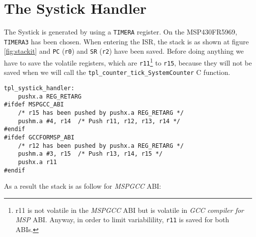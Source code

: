 \documentclass[11pt, oneside]{article}   	%
\begin{document}
\section{The Systick Handler}

The Systick is generated by using a \lstinline{TIMERA} register. On the MSP430FR5969, \lstinline{TIMERA3} has been chosen. When entering the ISR, the stack is as shown at figure \ref{fig:stackit} and \lstinline{PC} (\lstinline{r0}) and \lstinline{SR} (\lstinline{r2}) have been saved. Before doing anything we have to save the volatile registers, which are \lstinline{r11}\footnote{r11 is not volatile in the \emph{MSPGCC} ABI but is volatile in \emph{GCC compiler for MSP} ABI. Anyway, in order to limit variabilility, \lstinline{r11} is saved for both ABIs.} to \lstinline{r15}, because they will not be saved when we will call the \lstinline{tpl_counter_tick_SystemCounter} C function.

\begin{lstlisting}[basicstyle=\footnotesize\ttfamily]
tpl_systick_handler:
    pushx.a REG_RETARG
#ifdef MSPGCC_ABI
    /* r15 has been pushed by pushx.a REG_RETARG */
    pushm.a #4, r14  /* Push r11, r12, r13, r14 */
#endif
#ifdef GCCFORMSP_ABI
    /* r12 has been pushed by pushx.a REG_RETARG */
    pushm.a #3, r15  /* Push r13, r14, r15 */
    pushx.a r11
#endif
\end{lstlisting}

As a result the stack is as follow for \emph{MSPGCC} ABI:
\end{document}
